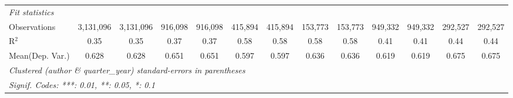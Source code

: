 \begin{tabular}{lcccccccccccc}
   \midrule
   \emph{Fit statistics}\\
   Observations                             & 3,131,096     & 3,131,096     & 916,098       & 916,098       & 415,894       & 415,894      & 153,773        & 153,773       & 949,332       & 949,332  & 292,527       & 292,527\\  
   R$^2$                                    & 0.35          & 0.35          & 0.37          & 0.37          & 0.58          & 0.58         & 0.58           & 0.58          & 0.41          & 0.41     & 0.44          & 0.44\\  
Mean(Dep. Var.) & 0.628 & 0.628 & 0.651 & 0.651 & 0.597 & 0.597 & 0.636 & 0.636 & 0.619 & 0.619 & 0.675 & 0.675 \\
   \midrule \midrule
   \multicolumn{13}{l}{\emph{Clustered (author \& quarter\_year) standard-errors in parentheses}}\\
   \multicolumn{13}{l}{\emph{Signif. Codes: ***: 0.01, **: 0.05, *: 0.1}}\\
\end{tabular}
\par\endgroup
